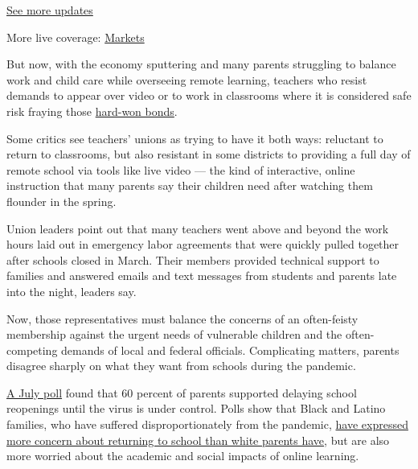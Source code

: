 \href{https://www.nytimes3xbfgragh.onion/2020/08/04/world/coronavirus-covid-19.html?action=click\&pgtype=Article\&state=default\&region=MAIN_CONTENT_1\&context=storylines_live_updates}{See
more updates}

More live coverage:
\href{https://www.nytimes3xbfgragh.onion/live/2020/08/03/business/stock-market-today-coronavirus?action=click\&pgtype=Article\&state=default\&region=MAIN_CONTENT_1\&context=storylines_live_updates}{Markets}

But now, with the economy sputtering and many parents struggling to
balance work and child care while overseeing remote learning, teachers
who resist demands to appear over video or to work in classrooms where
it is considered safe risk fraying those
\href{https://www.nytimes3xbfgragh.onion/2020/07/11/us/virus-teachers-classrooms.html}{hard-won
bonds}.

Some critics see teachers' unions as trying to have it both ways:
reluctant to return to classrooms, but also resistant in some districts
to providing a full day of remote school via tools like live video ---
the kind of interactive, online instruction that many parents say their
children need after watching them flounder in the spring.

Union leaders point out that many teachers went above and beyond the
work hours laid out in emergency labor agreements that were quickly
pulled together after schools closed in March. Their members provided
technical support to families and answered emails and text messages from
students and parents late into the night, leaders say.

Now, those representatives must balance the concerns of an often-feisty
membership against the urgent needs of vulnerable children and the
often-competing demands of local and federal officials. Complicating
matters, parents disagree sharply on what they want from schools during
the pandemic.

\href{https://www.kff.org/coronavirus-covid-19/report/kff-health-tracking-poll-july-2020/}{A
July poll} found that 60 percent of parents supported delaying school
reopenings until the virus is under control. Polls show that Black and
Latino families, who have suffered disproportionately from the pandemic,
\href{https://www.chalkbeat.org/2020/7/14/21324873/school-closure-reopening-parents-surveys}{have
expressed more concern about returning to school than white parents
have}, but are also more worried about the academic and social impacts
of online learning.

